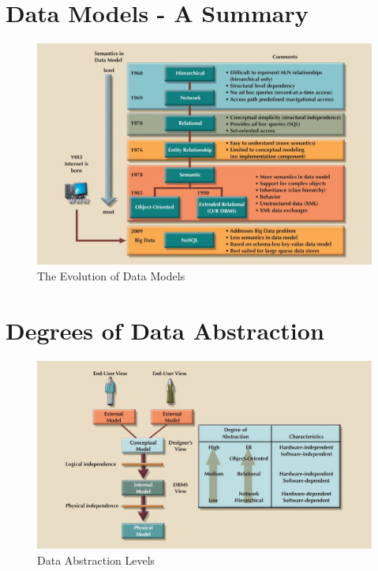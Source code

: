 \documentclass[a4paper, 12pt, titlepage]{report}
\begin{document}
\section{Data Models - A Summary}
\begin{figure}[H]
\centering
\includegraphics[scale=0.5]{DMSummary}
\caption{The Evolution of Data Models}
\end{figure}

\section{Degrees of Data Abstraction}
\begin{figure}[H]
\centering
\includegraphics[scale=0.45]{DLAbs}
\caption{Data Abstraction Levels}
\end{figure}
\end{document}
